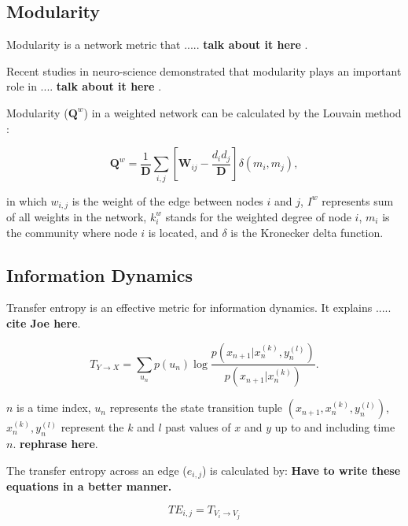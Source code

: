 \documentclass[fleqn,10pt,  amsmath,amssymb,aps]{wlscirep}
\begin{document}
\subsection*{Modularity}
Modularity is a network metric that ..... \textbf{talk about it here} \cite{Rubinov2009}.

Recent studies in neuro-science demonstrated that modularity plays an important role in .... \textbf{talk about it here} \cite{Godwin2015}. 
 
Modularity ($\mathbf Q^w$) in a weighted network can be calculated by the Louvain method \cite{Blondel2008}:
 
\begin{equation}
\mathbf Q^w = \frac{1}{\mathbf D} \sum \limits_{i,j} \left[\mathbf W_{ij} - \frac{d_i d_j}{\mathbf D} \right] \delta(m_i, m_j),
\label{eq:mod}
\end{equation}

in which $w_{i,j}$ is the weight of the edge between nodes $i$ and $j$, $I^w$ represents sum of all weights in the network, $k_i^w$ stands for the weighted degree of node $i$, $m_i$ is the community where node $i$ is located, and $\delta$ is the Kronecker delta function.

\subsection*{Information Dynamics}

Transfer entropy is an effective metric for information dynamics. It explains ..... \textbf{cite Joe here}.

\begin{equation}
T_{Y \rightarrow X} = \sum \limits_{u_n} p(u_n) \log \frac{p(x_{n+1}| x_n^{(k)}, y_n^{(l)})}{p(x_{n+1}|x_n^{(k)})}.
\end{equation}

$n$ is a time index, $u_n$ represents the state transition tuple $(x_{n+1}, x_n^{(k)}, y_n^{(l)})$, $x_n^{(k)}, y_n^{(l)}$ represent the $k$ and $l$ past values of $x$ and $y$ up to and including time $n$. \textbf{rephrase here}.


The transfer entropy across an edge ($e_{i,j}$) is calculated by:
\textbf{Have to write these equations in a better manner.}

\begin{equation}
TE_{i,j} = T_{V_i \rightarrow V_j}
\end{equation}
\end{document}
